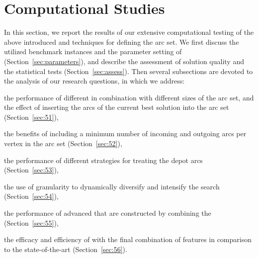 \documentclass[11pt,a4paper,fleqn]{article}
\begin{document}
\section{Computational Studies}
\label{sec:studies} 
In this section, we report the results of our extensive computational testing of the above introduced \sms and techniques for defining the \reduced arc set. We first discuss the utilized benchmark instances and the parameter setting of \tsnew  (Section~\ref{sec:parameters}), and describe the assessment of solution quality and the statistical tests (Section~\ref{sec:assess}). Then several subsections are devoted to the analysis of our research questions, in which we address:
\begin{compactitem}
\item the performance of different \sms in combination with different sizes of the \reduced arc set, and the effect of inserting the arcs of the current best solution into the \reduced arc set (Section~\ref{sec:51}), 
\item the benefits of including a minimum number of incoming and outgoing arcs per vertex in the \reduced arc set (Section~\ref{sec:52}),
\item the performance of different strategies for treating the depot arcs (Section~\ref{sec:53}), 
\item the use of granularity to dynamically diversify and intensify the search (Section~\ref{sec:54}), 
\item the performance of advanced \sms that are constructed by combining the \standalone \sms (Section~\ref{sec:55}),
\item the efficacy and efficiency of \tsnew with the final combination of features in comparison to the state-of-the-art (Section~\ref{sec:56}).
\end{compactitem}
\bigskip
{}
\end{document}
